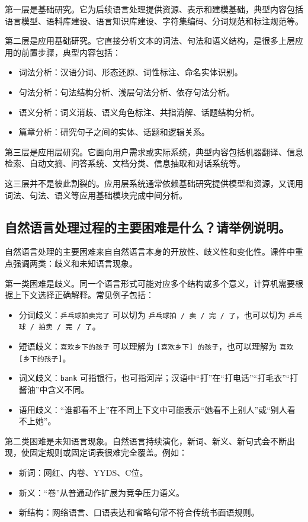 第一层是基础研究。它为后续语言处理提供资源、表示和建模基础，典型内容包括语言模型、语料库建设、语言知识库建设、字符集编码、分词规范和标注规范等。

第二层是应用基础研究。它直接分析文本的词法、句法和语义结构，是很多上层应用的前置步骤，典型内容包括：
\begin{itemize}
  \item 词法分析：汉语分词、形态还原、词性标注、命名实体识别。
  \item 句法分析：句法结构分析、浅层句法分析、依存句法分析。
  \item 语义分析：词义消歧、语义角色标注、共指消解、话题结构分析。
  \item 篇章分析：研究句子之间的实体、话题和逻辑关系。
\end{itemize}

第三层是应用层研究。它面向用户需求或实际系统，典型内容包括机器翻译、信息检索、自动文摘、问答系统、文档分类、信息抽取和对话系统等。

这三层并不是彼此割裂的。应用层系统通常依赖基础研究提供模型和资源，又调用词法、句法、语义等应用基础模块完成中间分析。

\subsection{自然语言处理过程的主要困难是什么？请举例说明。}

自然语言处理的主要困难来自自然语言本身的开放性、歧义性和变化性。课件中重点强调两类：歧义和未知语言现象。

第一类困难是歧义。同一个语言形式可能对应多个结构或多个意义，计算机需要根据上下文选择正确解释。常见例子包括：
\begin{itemize}
  \item 分词歧义：\texttt{乒乓球拍卖完了} 可以切为 \texttt{乒乓球拍 / 卖 / 完 / 了}，也可以切为 \texttt{乒乓球 / 拍卖 / 完 / 了}。
  \item 短语歧义：\texttt{喜欢乡下的孩子} 可以理解为 \texttt{[喜欢乡下] 的孩子}，也可以理解为 \texttt{喜欢 [乡下的孩子]}。
  \item 词义歧义：\texttt{bank} 可指银行，也可指河岸；汉语中“打”在“打电话”“打毛衣”“打酱油”中含义不同。
  \item 语用歧义：“谁都看不上”在不同上下文中可能表示“她看不上别人”或“别人看不上她”。
\end{itemize}

第二类困难是未知语言现象。自然语言持续演化，新词、新义、新句式会不断出现，使固定规则或固定词表很难完全覆盖。例如：
\begin{itemize}
  \item 新词：网红、内卷、YYDS、C位。
  \item 新义：“卷”从普通动作扩展为竞争压力语义。
  \item 新结构：网络语言、口语表达和省略句常不符合传统书面语规则。
\end{itemize}

